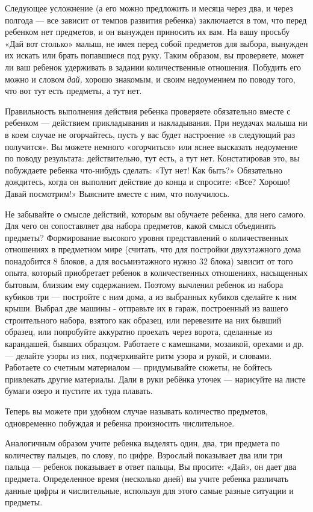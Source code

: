 \documentclass[a5paper]{book}
\renewcommand{\emph}[1]{\textit{#1}}
\begin{document}
Следующее усложнение (а его можно предложить и месяца через два, и через
полгода --- все зависит от темпов развития ребенка) заключается в том,
что перед ребенком нет предметов, и он вынужден приносить их вам. На
вашу просьбу «Дай вот столько» малыш, не имея перед собой предметов для
выбора, вынужден их искать или брать попавшиеся под руку. Таким образом,
вы проверяете, может ли ваш ребенок удерживать в задании количественные
отношения. Побудить его можно и словом \emph{дай,} хорошо знакомым, и
своим недоумением по поводу того, что вот тут есть предметы, а тут нет.

Правильность выполнения действия ребенка проверяете обязательно вместе с
ребенком --- действием прикладывания и накладывания. При неудачах малыша
ни в коем случае не огорчайтесь, пусть у вас будет настроение «в
следующий раз получится». Вы можете немного «огорчиться» или яснее
высказать недоумение по поводу результата: действительно, тут есть, а
тут нет. Констатировав это, вы побуждаете ребенка что-нибудь сделать:
«Тут нет! Как быть?» Обязательно дождитесь, когда он выполнит действие
до конца и спросите: «Все? Хорошо! Давай посмотрим!» Выясните вместе с
ним, что получилось.

Не забывайте о смысле действий, которым вы обучаете ребенка, для него
самого. Для чего он сопоставляет два набора предметов, какой смысл
объединять предметы? Формирование высокого уровня представлений о
количественных отношениях в предметном мире (считать, что для постройки
двухэтажного дома понадобится 8 блоков, а для восьмиэтажного нужно 32
блока) зависит от того опыта, который приобретает ребенок в
количественных отношениях, насыщенных бытовым, близким ему содержанием.
Поэтому вычленил ребенок из набора кубиков три --- постройте с ним дома,
а из выбранных кубиков сделайте к ним крыши. Выбрал две машины -
отправьте их в гараж, построенный из вашего строительного набора,
взятого как образец, или перевезите на них бывший образец, или
попробуйте аккуратно проехать через ворота, сделанные из карандашей,
бывших образцом. Работаете с камешками, мозаикой, орехами и др.---
делайте узоры из них, подчеркивайте ритм узора и рукой, и словами.
Работаете со счетным материалом --- придумывайте сюжеты, не бойтесь
привлекать другие материалы. Дали в руки ребёнка уточек --- нарисуйте на
листе бумаги озеро и пустите их туда плавать.

Теперь вы можете при удобном случае называть количество предметов,
одновременно побуждая и ребенка произносить числительное.

Аналогичным образом учите ребенка выделять один, два, три предмета по
количеству пальцев, по слову, по цифре. Взрослый показывает два или три
пальца --- ребенок показывает в ответ пальцы, Вы просите: «Дай», он дает
два предмета. Определенное время (несколько дней) вы учите ребенка
различать данные цифры и числительные, используя для этого самые разные
ситуации и предметы.
\end{document}
